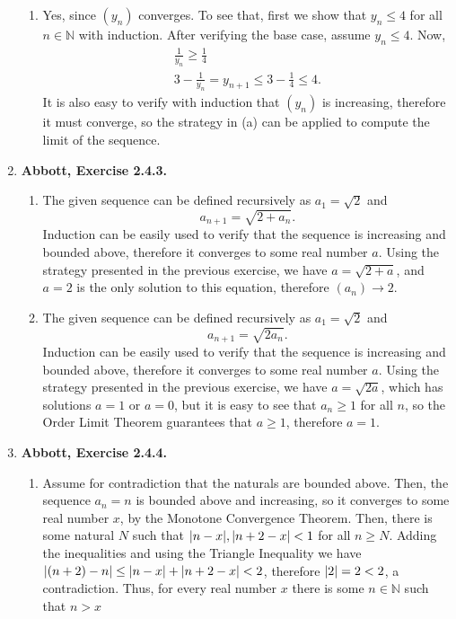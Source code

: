 \documentclass{article}
\DeclarePairedDelimiter\abs{\lvert}{\rvert}
\newcommand{\N}{\mathbb{N}}
\newcommand{\ra}{\rightarrow}
\newcommand{\exc}[2][Abbott]{\item \textbf{#1, Exercise #2.}}
\begin{document}
\begin{enumerate}
\begin{enumerate}
        \item Yes, since $(y_n)$ converges. To see that, first we show that $y_n \leq 4$ for all $n \in \N$ with induction. After verifying the base case, assume $y_n \leq 4$. Now, \begin{gather*}
            \frac{1}{y_n} \geq \frac{1}{4} \\ 
            3 - \frac{1}{y_n} = y_{n+1} \leq 3-\frac{1}{4} \leq 4.
        \end{gather*} It is also easy to verify with induction that $(y_n)$ is increasing, therefore it must converge, so the strategy in (a) can be applied to compute the limit of the sequence.
    \end{enumerate}
    
    \exc{2.4.3} 
    \begin{enumerate}
        \item The given sequence can be defined recursively as $a_1 = \sqrt{2}$ and
        \begin{equation*}
            a_{n+1} = \sqrt{2 + a_n}.
        \end{equation*} Induction can be easily used to verify that the sequence is increasing and bounded above, therefore it converges to some real number $a$. Using the strategy presented in the previous exercise, we have $a = \sqrt{2 + a}$, and $a=2$ is the only solution to this equation, therefore $(a_n) \ra 2$.
        
        \item The given sequence can be defined recursively as $a_1 = \sqrt{2}$ and
        \begin{equation*}
            a_{n+1} = \sqrt{2 a_n}.
        \end{equation*} Induction can be easily used to verify that the sequence is increasing and bounded above, therefore it converges to some real number $a$. Using the strategy presented in the previous exercise, we have $a = \sqrt{2a}$, which has solutions $a = 1$ or $a = 0$, but it is easy to see that $a_n \geq 1$ for all $n$, so the Order Limit Theorem guarantees that $a \geq 1$, therefore $a = 1$.
    \end{enumerate}
    
    \exc{2.4.4}
    \begin{enumerate}
        \item Assume for contradiction that the naturals are bounded above. Then, the sequence $a_n = n$ is bounded above and increasing, so it converges to some real number $x$, by the Monotone Convergence Theorem. Then, there is some natural $N$ such that $\abs{n-x}, \abs{n+2-x} < 1$ for all $n \geq N$. Adding the inequalities and using the Triangle Inequality we have $\abs{(n+2)-n} \leq \abs{n-x}+\abs{n+2-x} < 2$, therefore $\abs{2}=2 < 2$, a contradiction. Thus, for every real number $x$ there is some $n \in \N$ such that $n > x$
        

\end{enumerate}
\end{enumerate}
\end{document}
